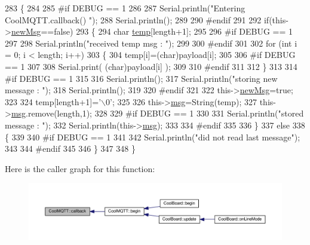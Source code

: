 \begin{DoxyCode}
283 \{
284 
285 \textcolor{preprocessor}{#if DEBUG == 1}
286 
287     Serial.println(\textcolor{stringliteral}{"Entering CoolMQTT.callback() "});
288     Serial.println();
289 
290 \textcolor{preprocessor}{#endif }
291 
292     \textcolor{keywordflow}{if}(this->\hyperlink{classCoolMQTT_a3240388137b885775aadf38e96b24c6b}{newMsg}==\textcolor{keyword}{false})
293     \{
294         \textcolor{keywordtype}{char} \hyperlink{Irene3000_8h_a5905d48604152cf57aa6bfa087b49173}{temp}[length+1];
295 
296 \textcolor{preprocessor}{    #if DEBUG == 1}
297 
298         Serial.println(\textcolor{stringliteral}{"received temp msg : "});
299 
300 \textcolor{preprocessor}{    #endif}
301         
302         \textcolor{keywordflow}{for} (\textcolor{keywordtype}{int} i = 0; i < length; i++) 
303         \{
304             temp[i]=(char)payload[i];
305         
306 \textcolor{preprocessor}{        #if DEBUG == 1 }
307 
308             Serial.print( (\textcolor{keywordtype}{char})payload[i] );
309         
310 \textcolor{preprocessor}{        #endif}
311 
312         \}
313     
314 \textcolor{preprocessor}{    #if DEBUG == 1 }
315 
316         Serial.println();
317         Serial.println(\textcolor{stringliteral}{"storing new message : "});
318         Serial.println();
319     
320 \textcolor{preprocessor}{    #endif}
321 
322         this->\hyperlink{classCoolMQTT_a3240388137b885775aadf38e96b24c6b}{newMsg}=\textcolor{keyword}{true};
323 
324         temp[length+1]=\textcolor{charliteral}{'\(\backslash\)0'};
325 
326         this->\hyperlink{classCoolMQTT_af6b19e7074dbbb4ae493c44dcb53f7ff}{msg}=String(temp);
327         this->\hyperlink{classCoolMQTT_af6b19e7074dbbb4ae493c44dcb53f7ff}{msg}.remove(length,1);
328     
329 \textcolor{preprocessor}{    #if DEBUG == 1 }
330 
331         Serial.println(\textcolor{stringliteral}{"stored message : "});
332         Serial.println(this->\hyperlink{classCoolMQTT_af6b19e7074dbbb4ae493c44dcb53f7ff}{msg});
333     
334 \textcolor{preprocessor}{    #endif}
335 
336     \}
337     \textcolor{keywordflow}{else}
338     \{
339     
340 \textcolor{preprocessor}{    #if DEBUG == 1}
341 
342         Serial.println(\textcolor{stringliteral}{"did not read last message"});
343     
344 \textcolor{preprocessor}{    #endif }
345         
346     \}
347 
348 \}
\end{DoxyCode}
Here is the caller graph for this function\+:\nopagebreak
\begin{figure}[H]
\begin{center}
\leavevmode
\includegraphics[width=350pt]{classCoolMQTT_a30d82ad665bfb603f46ecdbc290775df_icgraph}
\end{center}
\end{figure}
\mbox{\label{classCoolMQTT_a9b703de4f1358f0ee7a5e8c44979c648}} 
